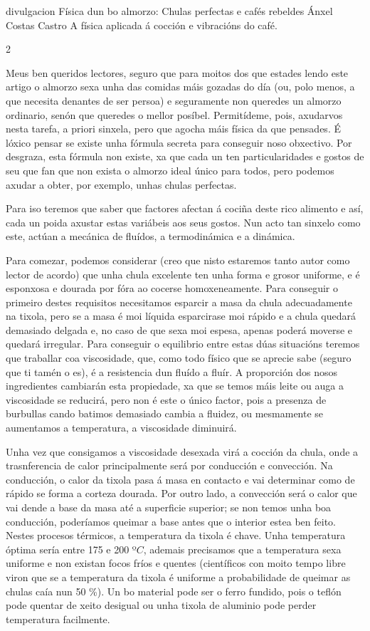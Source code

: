 \Titular%
{divulgacion}
{Física dun bo almorzo: Chulas perfectas e cafés rebeldes}
{Ánxel Costas Castro}
{A física aplicada á cocción e vibracións do café.}


\begin{multicols}{2}

Meus ben queridos lectores, seguro que para moitos dos que estades lendo este
artigo o almorzo sexa unha das comidas máis gozadas do día (ou, polo menos, a
que necesita denantes de ser persoa) e seguramente non queredes un almorzo
ordinario, senón que queredes o mellor posíbel. Permitídeme, pois, axudarvos
nesta tarefa, a priori sinxela, pero que agocha máis física da que pensades. É
lóxico pensar se existe unha fórmula secreta para conseguir noso obxectivo. Por
desgraza, esta fórmula non existe, xa que cada un ten particularidades e gostos
de seu que fan que non exista o almorzo ideal único para todos, pero podemos
axudar a obter, por exemplo, unhas chulas perfectas.

Para iso teremos que saber que factores afectan á cociña deste rico alimento e
así, cada un poida axustar estas variábeis aos seus gostos. Nun acto tan
sinxelo como este, actúan a mecánica de fluídos, a termodinámica e a dinámica.

Para comezar, podemos considerar (creo que nisto estaremos tanto autor como
lector de acordo) que unha chula excelente ten unha forma e grosor uniforme, e
é esponxosa e dourada por fóra ao cocerse homoxeneamente. Para conseguir o
primeiro destes requisitos necesitamos esparcir a masa da chula adecuadamente
na tixola, pero se a masa é moi líquida esparcirase moi rápido e a chula
quedará demasiado delgada e, no caso de que sexa moi espesa, apenas poderá
moverse e quedará irregular. Para conseguir o equilibrio entre estas dúas
situacións teremos que traballar coa viscosidade, que, como todo físico que se
aprecie sabe (seguro que ti tamén o es), é a resistencia dun fluído a fluír. A
proporción dos nosos ingredientes cambiarán esta propiedade, xa que se temos
máis leite ou auga a viscosidade se reducirá, pero non é este o único factor,
pois a presenza de burbullas cando batimos demasiado cambia a fluidez, ou
mesmamente se aumentamos a temperatura, a viscosidade diminuirá.

Unha vez que consigamos a viscosidade desexada virá a cocción da chula, onde a
trasnferencia de calor principalmente será por conducción e convección. Na
conducción, o calor da tixola pasa á masa en contacto e vai determinar como de
rápido se forma a corteza dourada. Por outro lado, a convección será o calor
que vai dende a base da masa até a superficie superior; se non temos unha boa
conducción, poderíamos queimar a base antes que o interior estea ben feito.
Nestes procesos térmicos, a temperatura da tixola é chave. Unha temperatura
óptima sería entre 175 e 200 º$C$, ademais precisamos que a temperatura sexa
uniforme e non existan focos fríos e quentes (científicos con moito tempo libre
viron que se a temperatura da tixola é uniforme a probabilidade de queimar as
chulas caía nun 50 \%). Un bo material pode ser o ferro fundido, pois o teflón
pode quentar de xeito desigual ou unha tixola de aluminio pode perder
temperatura facilmente.


\end{multicols}
